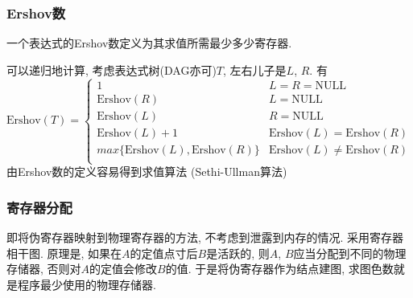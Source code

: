 \documentclass{ctexart}
\begin{document}
\subsubsection{Ershov数} 一个表达式的Ershov数定义为其求值所需最少多少寄存器.\par
    可以递归地计算, 考虑表达式树(DAG亦可)$T$, 左右儿子是$L$, $R$. 有\[
        \text{Ershov}(T) = \begin{cases}
            1 & L = R = \text{NULL}\\
            \text{Ershov}(R) & L = \text{NULL}\\
            \text{Ershov}(L) & R = \text{NULL}\\
            \text{Ershov}(L) + 1 & \text{Ershov}(L) = \text{Ershov}(R)\\
            max\{\text{Ershov}(L), \text{Ershov}(R)\} & \text{Ershov}(L) \neq \text{Ershov}(R)\\
        \end{cases}\]
    由Ershov数的定义容易得到求值算法 (Sethi-Ullman算法)
\subsubsection{寄存器分配}
    即将伪寄存器映射到物理寄存器的方法, 不考虑到泄露到内存的情况.
    采用寄存器相干图. 原理是, 如果在$A$的定值点寸后$B$是活跃的,
    则$A$, $B$应当分配到不同的物理存储器, 否则对$A$的定值会修改$B$的值.
    于是将伪寄存器作为结点建图, 求图色数就是程序最少使用的物理存储器.


\end{document}
